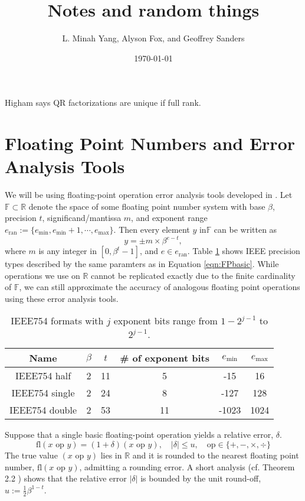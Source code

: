 \documentclass{article}
\title{Notes and random things}
\author{L. Minah Yang, Alyson Fox, and Geoffrey Sanders}
\date{\today}
\newcommand{\R}{\mathbb{R}}
\newcommand{\F}{\mathbb{F}}
\newcommand{\dd}{\delta}
\newcommand{\fl}{\mathrm{fl}}
\theoremstyle{definition}
\begin{document}
{\color{blue}Higham says QR factorizations are unique if full rank.}
\section{Floating Point Numbers and Error Analysis Tools}
We will be using floating-point operation error analysis tools developed in \citet{Higham2002}.
Let $\F \subset \R$ denote the space of some floating point number system with base $\beta$, precision $t$, significand/mantissa $m$, and exponent range $e_{\text{ran}}:=\{e_{\text{min}}, e_{\text{min}}+1, \cdots, e_{\text{max}} \}$.
Then every element $y$ in$\F$ can be written as 
\begin{equation}
y = \pm m\times \beta^{e-t},
\label{eqn:FPbasic}
\end{equation} 
where $m$ is any integer in $[0,\beta^{t}-1]$, and $e\in e_{\text{ran}}$.
Table \ref{table:ieee} shows IEEE precision types described by the same paramters as in Equation \ref{eqn:FPbasic}.
While operations we use on $\R$ cannot be replicated exactly due to the finite cardinality of $\F$, we can still approximate the accuracy of analogous floating point operations using these error analysis tools. \par

\begin{table}[h]
	\centering
	\begin{tabular}{||c|c|c|c|c|c||} 
		\hline 
		Name & $\beta$ & $t$ & \# of exponent bits & $e_{\text{min}}$ & $e_{\text{max}}$ \\ \hline 
		IEEE754 half & 2 & 11 & 5 & -15 & 16  \\ \hline 
		IEEE754 single & 2 & 24 & 8 & -127 & 128 \\ \hline 
		IEEE754 double& 2 & 53 & 11 & -1023 & 1024 \\ \hline 
	\end{tabular}
	\caption{IEEE754 formats with $j$ exponent bits range from $1-2^{j-1}$ to $2^{j-1}$.}
	\label{table:ieee}
\end{table}
 
Suppose that a single basic floating-point operation yields a relative error, $\dd$.
\begin{equation}
\fl(x\text{ op }y) = (1 + \dd)(x\text{ op }y),\quad |\dd|\leq u, \quad \text{op}\in\{+, -, \times, \div\} \label{eqn: singlefpe}
\end{equation}
The true value $(x\text{ op }y)$ lies in $\R$ and it is rounded to the nearest floating point number, $\fl(x\text{ op }y)$, admitting a rounding error. 
A short analysis (cf. Theorem 2.2 \citep{Higham2002}) shows that the relative error $|\dd|$ is bounded by the unit round-off, $u:=\frac{1}{2}\beta^{1-t}$. \par
\end{document}

